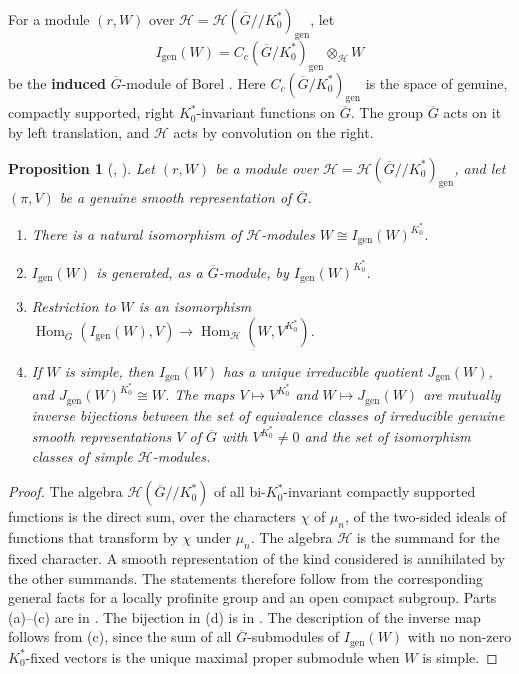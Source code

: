 \documentclass[12pt,letterpaper]{amsart}
\numberwithin{equation}{section}
\newtheorem{proposition}[theorem]{Proposition}
\theoremstyle{definition}
\theoremstyle{remark}
\DeclareMathOperator{\Hom}{Hom}
\newcommand{\cH}{\mathcal{H}}
\newcommand{\Gbar}{\overline{G}}
\newcommand{\gen}{\mathrm{gen}}
\begin{document}
For a module $(r,W)$ over $\cH=\cH(\Gbar/\!/K_0^*)_{\gen}$, let
\[
I_{\gen}(W)=C_c(\Gbar/K_0^*)_{\gen}\otimes_{\cH}W
\]
be the \textbf{induced} $\Gbar$-module of Borel \cite[\S2]{Bo76}. Here
$C_c(\Gbar/K_0^*)_{\gen}$ is the space of genuine, compactly supported,
right $K_0^*$-invariant functions on $\Gbar$. The group $\Gbar$ acts on
it by left translation, and $\cH$ acts by convolution on the right.

\begin{proposition}[{\cite[\S\S1--2]{Bo76}, \cite[\S4.3]{BH06}}]
\label{prop:borel}
Let $(r,W)$ be a module over $\cH=\cH(\Gbar/\!/K_0^*)_{\gen}$, and let
$(\pi,V)$ be a genuine smooth representation of $\Gbar$.
\begin{enumerate}[leftmargin=2em,label=(\alph*)]
\item There is a natural isomorphism of $\cH$-modules
$W\cong I_{\gen}(W)^{K_0^*}$.
\item $I_{\gen}(W)$ is generated, as a $\Gbar$-module, by
$I_{\gen}(W)^{K_0^*}$.
\item Restriction to $W$ is an isomorphism
$\Hom_{\Gbar}(I_{\gen}(W),V)\to\Hom_{\cH}(W,V^{K_0^*})$.
\item If $W$ is simple, then $I_{\gen}(W)$ has a unique irreducible
quotient $J_{\gen}(W)$, and $J_{\gen}(W)^{K_0^*}\cong W$. The maps
$V\mapsto V^{K_0^*}$ and $W\mapsto J_{\gen}(W)$ are mutually inverse
bijections between the set of equivalence classes of irreducible
genuine smooth representations $V$ of $\Gbar$ with $V^{K_0^*}\neq 0$
and the set of isomorphism classes of simple $\cH$-modules.
\end{enumerate}
\end{proposition}

\begin{proof}
The algebra $\cH(\Gbar/\!/K_0^*)$ of all bi-$K_0^*$-invariant compactly
supported functions is the direct sum, over the characters $\chi$ of
$\mu_n$, of the two-sided ideals of functions that transform by $\chi$
under $\mu_n$. The algebra $\cH$ is the summand for the fixed
character. A smooth representation of the kind considered is
annihilated by the other summands. The statements therefore follow
from the corresponding general facts for a locally profinite group and
an open compact subgroup. Parts (a)--(c) are in \cite[\S\S1--2]{Bo76}.
The bijection in (d) is in \cite[\S4.3]{BH06}. The description of the
inverse map follows from (c), since the sum of all
$\Gbar$-submodules of $I_{\gen}(W)$ with no non-zero $K_0^*$-fixed
vectors is the unique maximal proper submodule when $W$ is simple.
\end{proof}
\end{document}
